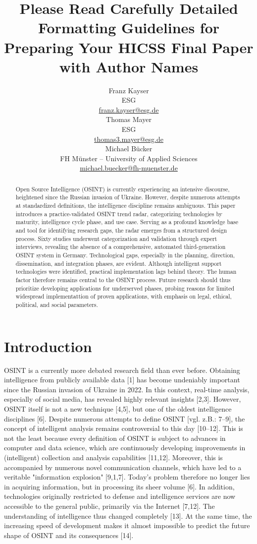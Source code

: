 \documentclass[10pt]{article}
\title{Please Read Carefully Detailed Formatting Guidelines for Preparing Your HICSS Final Paper with Author Names}
\author{Franz Kayser \\
  ESG \\
  {\underline{ franz.kayser@esg.de}} \\\And
  Thomas Mayer \\
  ESG  \\
  {\underline{ thomas3.mayer@esg.de} }\\\And 
  Michael Bücker \\
  FH Münster -- University of Applied Sciences\\
  {\underline{michael.buecker@fh-muenster.de}} \\}
\date{}
\begin{document}
\maketitle
\begin{abstract}
    

    Open Source Intelligence (OSINT) is currently experiencing an intensive discourse, heightened since the Russian invasion of Ukraine. However, despite numerous attempts at standardized definitions, the intelligence discipline remains ambiguous. This paper introduces a practice-validated OSINT trend radar, categorizing technologies by maturity, intelligence cycle phase, and use case. Serving as a profound knowledge base and tool for identifying research gaps, the radar emerges from a structured design process. Sixty studies underwent categorization and validation through expert interviews, revealing the absence of a comprehensive, automated third-generation OSINT system in Germany. Technological gaps, especially in the planning, direction, dissemination, and integration phases, are evident. Although intelligent support technologies were identified, practical implementation lags behind theory. The human factor therefore remains central to the OSINT process. Future research should thus prioritize developing applications for underserved phases, probing reasons for limited widespread implementattion of proven applications, with emphasis on legal, ethical, political, and social parameters.


\end{abstract}

\section{Introduction}

OSINT is a currently more debated research field than ever before. Obtaining intelligence from publicly available data [1] has become undeniably important since the Russian invasion of Ukraine in 2022. In this context, real-time analysis, especially of social media, has revealed highly relevant insights [2,3]. However, OSINT itself is not a new technique [4,5], but one of the oldest intelligence disciplines [6]. Despite numerous attempts to define OSINT [vgl. z.B.: 7–9], the concept of intelligent analysis remains controversial to this day [10–12]. This is not the least because every definition of OSINT is subject to advances in computer and data science, which are continuously developing improvements in (intelligent) collection and analysis capabilities [11,12]. Moreover, this is accompanied by numerous novel communication channels, which have led to a veritable "information explosion" [9,1,7]. Today's problem therefore no longer lies in acquiring information, but in processing its sheer volume [6]. In addition, technologies originally restricted to defense and intelligence services are now accessible to the general public, primarily via the Internet [7,12]. The understanding of intelligence thus changed completely [13]. At the same time, the increasing speed of development makes it almost impossible to predict the future shape of OSINT and its consequences [14].
\end{document}

